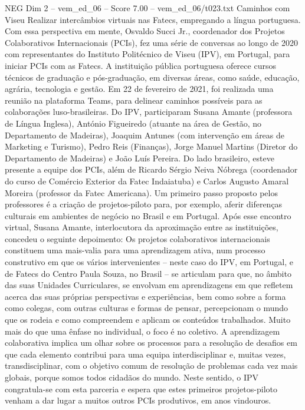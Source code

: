 \begin{textsample}{NEG Dim 2 – vem\_ed\_06 – Score 7.00 – vem\_ed\_06/t023.txt}  \label{ex:f2_neg_100}
Caminhos com Viseu Realizar intercâmbios virtuais nas Fatecs, empregando a língua portuguesa.
Com essa perspectiva em mente, Osvaldo Succi Jr., coordenador dos Projetos Colaborativos Internacionais (PCIs), fez uma série de conversas ao longo de 2020 com representantes do Instituto Politécnico de Viseu (IPV), em Portugal, para iniciar PCIs com as Fatecs.
A instituição pública portuguesa oferece cursos técnicos de graduação e pós-graduação, em diversas áreas, como saúde, educação, agrária, tecnologia e gestão.
Em 22 de fevereiro de 2021, foi realizada uma reunião na plataforma Teams, para delinear caminhos possíveis para as colaborações luso-brasileiras.
Do IPV, participaram Susana Amante (professora de Língua Inglesa), António Figueiredo (atuante na área de Gestão, no Departamento de Madeiras), Joaquim Antunes (com intervenção em áreas de Marketing e Turismo), Pedro Reis (Finanças), Jorge Manuel Martins (Diretor do Departamento de Madeiras) e João Luís Pereira.
Do lado brasileiro, esteve presente a equipe dos PCIs, além de Ricardo Sérgio Neiva Nóbrega (coordenador do curso de Comércio Exterior da Fatec Indaiatuba) e Carlos Augusto Amaral Moreira (professor da Fatec Americana).
Um primeiro passo proposto pelos professores é a criação de projetos-piloto para, por exemplo, aferir diferenças culturais em ambientes de negócio no Brasil e em Portugal.
Após esse encontro virtual, Susana Amante, interlocutora da aproximação entre as instituições, concedeu o seguinte depoimento: Os projetos colaborativos internacionais constituem uma mais-valia para uma aprendizagem ativa, num processo construtivo em que os vários intervenientes – neste caso do IPV, em Portugal, e de Fatecs do Centro Paula Souza, no Brasil – se articulam para que, no âmbito das suas Unidades Curriculares, se envolvam em aprendizagens em que refletem acerca das suas próprias perspectivas e experiências, bem como sobre a forma como colegas, com outras culturas e formas de pensar, percepcionam o mundo que os rodeia e como compreendem e aplicam os conteúdos trabalhados.
Muito mais do que uma ênfase no individual, o foco é no coletivo.
A aprendizagem colaborativa implica um olhar sobre os processos para a resolução de desafios em que cada elemento contribui para uma equipa interdisciplinar e, muitas vezes, transdisciplinar, com o objetivo comum de resolução de problemas cada vez mais globais, porque somos todos cidadãos do mundo.
Neste sentido, o IPV congratula-se com esta parceria e espera que estes primeiros projetos-piloto venham a dar lugar a muitos outros PCIs produtivos, em anos vindouros.

\end{textsample}
